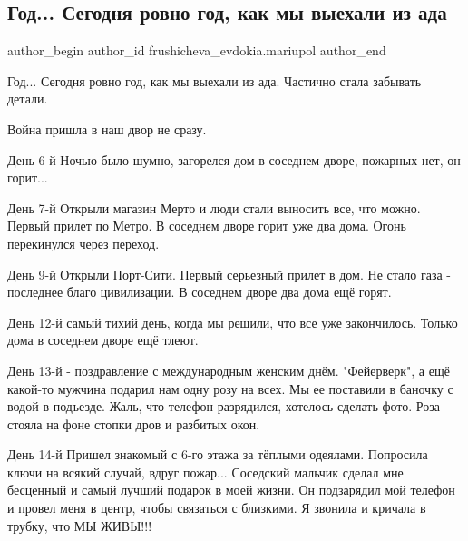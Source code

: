  
 
 
 
 

\subsection{Год... Сегодня ровно год, как мы выехали из ада}
\label{sec:17_03_2023.fb.frushicheva_evdokia.mariupol.1.segodnja_rovno_god_kak_my_vyehali_iz_ada}

\ifcmt
 author_begin
   author_id frushicheva_evdokia.mariupol
 author_end
\fi

Год... Сегодня ровно год, как мы выехали из ада. Частично стала забывать
детали.

Война пришла в наш двор не сразу.

День 6-й Ночью было шумно, загорелся дом в соседнем дворе, пожарных нет, он
горит...

День 7-й Открыли магазин Мерто и люди стали выносить все, что можно. Первый
прилет по Метро. В соседнем дворе горит уже два дома. Огонь перекинулся через
переход. 

День 9-й Открыли Порт-Сити. Первый серьезный прилет в дом. Не стало газа -
последнее благо цивилизации. В соседнем дворе два дома ещё горят.

День 12-й самый тихий день, когда мы решили, что все уже закончилось. Только
дома в соседнем дворе ещё тлеют.

День 13-й - поздравление с международным женским днём. "Фейерверк", а ещё
какой-то мужчина подарил нам одну розу на всех. Мы ее поставили в баночку с
водой в подъезде. Жаль, что телефон разрядился, хотелось сделать фото. Роза
стояла на фоне стопки дров и разбитых окон.

День 14-й Пришел знакомый с 6-го этажа за тёплыми одеялами. Попросила ключи на
всякий случай, вдруг пожар... Соседский мальчик сделал мне бесценный и самый
лучший подарок в моей жизни. Он подзарядил мой телефон и провел меня в центр,
чтобы связаться с близкими. Я звонила и кричала в трубку, что МЫ ЖИВЫ!!! 

